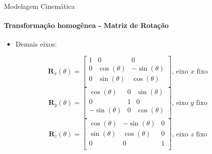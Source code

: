 \documentclass{beamer}
\begin{document}
\begin{frame}{Modelagem Cinemática}
    \framesubtitle{Transformação homogênea - Matriz de Rotação}
    \begin{itemize}
        \item Demais eixos:
    \end{itemize}
    \begin{block}{}
        \begin{equation*}
            \mathbf{R}_x(\theta) =
            \begin{bmatrix}
                1 & 0            & 0             \\
                0 & \cos(\theta) & -\sin(\theta) \\
                0 & \sin(\theta) & \cos(\theta)  \\
            \end{bmatrix} \text{, eixo $x$ fixo}
        \end{equation*}
        \begin{equation*}
            \mathbf{R}_y(\theta) =
            \begin{bmatrix}
                \cos(\theta)  & 0 & \sin(\theta) \\
                0             & 1 & 0            \\
                -\sin(\theta) & 0 & \cos(\theta) \\
            \end{bmatrix} \text{, eixo $y$ fixo}
        \end{equation*}
        \begin{equation*}
            \mathbf{R}_z(\theta) =
            \begin{bmatrix}
                \cos(\theta) & -\sin(\theta) & 0 \\
                \sin(\theta) & \cos(\theta) & 0 \\
                0            & 0            & 1 \\
            \end{bmatrix} \text{, eixo $z$ fixo}
        \end{equation*}
    \end{block}
\end{frame}


\end{document}
